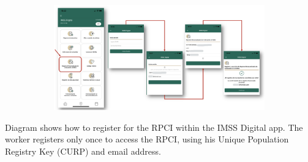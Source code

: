 \begin{figure}[H]
    \caption{Registering for the RPCI}
    \label{rpci_register}
    \begin{center}
    
    \begin{subfigure}{0.9\textwidth}
    \includegraphics[width=\textwidth]{04_Figures/rpci_app/rpci_register.png}
    \end{subfigure}

    \end{center}
\end{figure}
\scriptsize{
\noindent Diagram shows how to register for the RPCI within the IMSS Digital app. The worker registers only once to access the RPCI, using his Unique Population Registry Key (CURP) and email address.
}


